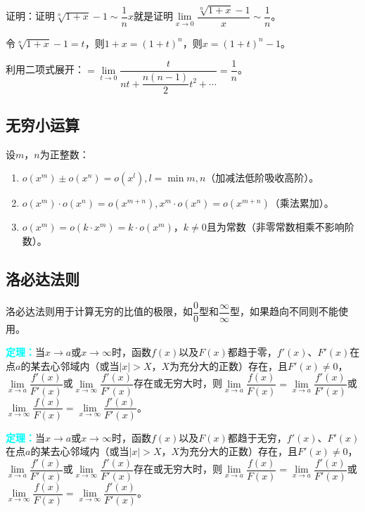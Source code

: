 \documentclass[UTF8, 12pt]{ctexart}
\begin{document}
证明：证明$\sqrt[n]{1+x}-1\sim\dfrac{1}{n}x$就是证明$\lim\limits_{x\to 0}\dfrac{\sqrt[n]{1+x}-1}{x}\sim\dfrac{1}{n}$。

令$\sqrt[n]{1+x}-1=t$，则$1+x=(1+t)^n$，则$x=(1+t)^n-1$。

利用二项式展开：$=\lim\limits_{t\to 0}\dfrac{t}{nt+\dfrac{n(n-1)}{2}t^2+\cdots}=\dfrac{1}{n}$。

\subsection{无穷小运算}

设$m$，$n$为正整数：

\begin{enumerate}
    \item $o(x^m)\pm o(x^n)=o(x^l),l=\min{m,n}$（加减法低阶吸收高阶）。
    \item $o(x^m)\cdot o(x^n)=o(x^{m+n}),x^m\cdot o(x^n)=o(x^{m+n})$（乘法累加）。
    \item $o(x^m)=o(k\cdot x^m)=k\cdot o(x^m)$，$k\neq 0$且为常数（非零常数相乘不影响阶数）。
\end{enumerate}

\subsection{洛必达法则}

洛必达法则用于计算无穷的比值的极限，如$\dfrac{0}{0}$型和$\dfrac{\infty}{\infty}$型，如果趋向不同则不能使用。

\textcolor{aqua}{\textbf{定理：}}当$x\to a$或$x\to\infty$时，函数$f(x)$以及$F(x)$都趋于零，$f'(x)$、$F'(x)$在点$a$的某去心邻域内（或当$\vert x\vert>X$，$X$为充分大的正数）存在，且$F'(x)\neq0$，$\lim\limits_{x\to a}\dfrac{f'(x)}{F'(x)}$或$\lim\limits_{x\to\infty}\dfrac{f'(x)}{F'(x)}$存在或无穷大时，则$\lim\limits_{x\to a}\dfrac{f(x)}{F(x)}=\lim\limits_{x\to a}\dfrac{f'(x)}{F'(x)}$或$\lim\limits_{x\to\infty}\dfrac{f(x)}{F(x)}=\lim\limits_{x\to\infty}\dfrac{f'(x)}{F'(x)}$。

\textcolor{aqua}{\textbf{定理：}}当$x\to a$或$x\to\infty$时，函数$f(x)$以及$F(x)$都趋于无穷，$f'(x)$、$F'(x)$在点$a$的某去心邻域内（或当$\vert x\vert>X$，$X$为充分大的正数）存在，且$F'(x)\neq0$，$\lim\limits_{x\to a}\dfrac{f'(x)}{F'(x)}$或$\lim\limits_{x\to\infty}\dfrac{f'(x)}{F'(x)}$存在或无穷大时，则$\lim\limits_{x\to a}\dfrac{f(x)}{F(x)}=\lim\limits_{x\to a}\dfrac{f'(x)}{F'(x)}$或$\lim\limits_{x\to\infty}\dfrac{f(x)}{F(x)}=\lim\limits_{x\to\infty}\dfrac{f'(x)}{F'(x)}$。
\end{document}
